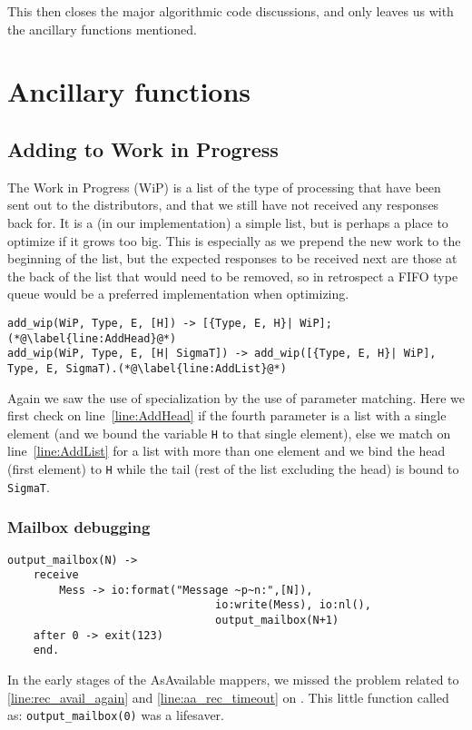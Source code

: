 This then closes the major algorithmic code discussions, and only
leaves us with the ancillary functions mentioned.


\section{Ancillary functions}
\label{sec:ancillary-functions}

\subsection{Adding to Work in Progress}
\label{sec:adding-work-progress}

The Work in Progress (WiP) is a list of the type of processing that
have been sent out to the distributors, and that we still have not
received any responses back for. It is a (in our implementation) a
simple list, but is perhaps a place to optimize if it grows too
big. This is especially as we prepend the new work to the beginning of
the list, but the expected responses to be received next are those at
the back of the list that would need to be removed, so in retrospect a
FIFO type queue would be a preferred implementation when optimizing.

\begin{lstlisting}[name=hvp2]
%For all the Sigma add {E,i} to the Work In Progress
add_wip(WiP, Type, E, [H]) -> [{Type, E, H}| WiP];(*@\label{line:AddHead}@*)
add_wip(WiP, Type, E, [H| SigmaT]) -> add_wip([{Type, E, H}| WiP], Type, E, SigmaT).(*@\label{line:AddList}@*)
\end{lstlisting}

Again we saw the use of specialization by the use of parameter
matching. Here we first check on line~\autoref{line:AddHead} if the fourth
parameter is a list with a single element (and we bound the variable
\texttt{H} to that single element), else we match on
line~\autoref{line:AddList} for a list with more than one element and we bind
the head (first element) to \texttt{H} while the tail (rest of the list
excluding the head) is bound to \texttt{SigmaT}.

\subsubsection{Mailbox debugging}

\begin{lstlisting}[name=hvp2]
 output_mailbox(N) ->
	receive
		Mess -> io:format("Message ~p~n:",[N]),
								io:write(Mess), io:nl(),
								output_mailbox(N+1)
	after 0 -> exit(123)
	end.
\end{lstlisting}

In the early stages of the AsAvailable mappers, we missed the problem
related to \autoref{line:rec_avail_again} and
\ref{line:aa_rec_timeout} on \pageref{line:rec_avail_again}. This
little function called as: \texttt{output\_mailbox(0)} was a lifesaver.


